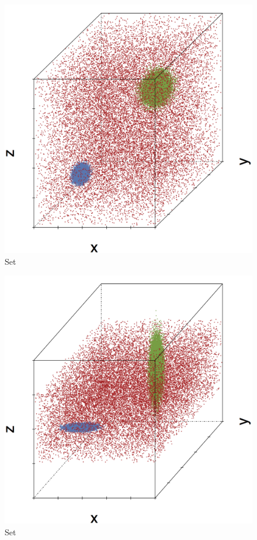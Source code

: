 \begin{subfigure}{0.23\textwidth}
	\centering
	\includegraphics[width=\textwidth]{3/img/datasetplot_ferdosi_2_60000.png}
	\caption{Set \ferdosiTwo}
	\label{fig:3:simulated:datasets:ferdosi2}
\end{subfigure}	
\begin{subfigure}{0.23\textwidth}
	\centering
	\includegraphics[width=\textwidth]{3/img/datasetplot_baakman_2_60000.png}
	\caption{Set \baakmanTwo}
	\label{fig:3:simulated:datasets:baakman2}
\end{subfigure}	
